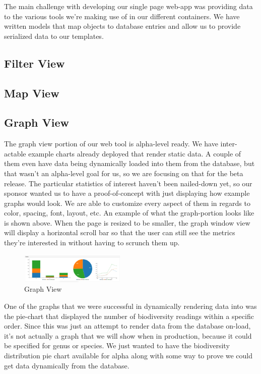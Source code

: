 \documentclass[10pt,journal,onecolumn,draftclsnofoot]{IEEEtran}
\begin{document}
The main challenge with developing our single page web-app was providing data to the various tools we’re making use of in our different containers.
We have written models that map objects to database entries and allow us to provide serialized data to our templates.

\subsection{Filter View}

\subsection{Map View}

\subsection{Graph View} %
The graph view portion of our web tool is alpha-level ready.
We have inter-actable example charts already deployed that render  static data.
A couple of them even have data being dynamically loaded into them from the database, but that wasn’t an alpha-level goal for us, so we are focusing on that for the beta release.
The particular statistics of interest haven’t been nailed-down yet, so our sponsor wanted us to have a proof-of-concept with just displaying how example graphs would look.
We are able to customize every aspect of them in regards to color, spacing, font, layout, etc.
An example of what the graph-portion looks like is shown above.
When the page is resized to be smaller, the graph window view will display a horizontal scroll bar so that the user can still see the metrics they’re interested in without having to scrunch them up.

\begin{figure}[h]
\caption{Graph View}
\centering
\includegraphics[width=0.45\textwidth]{images/figure_6.jpg}
\end{figure}

One of the graphs that we were successful in dynamically rendering data into was the pie-chart that displayed the number of biodiversity readings within a specific order.
Since this was just an attempt to render data from the database on-load, it’s not actually a graph that we will show when in production, because it could be specified for genus or species.
We just wanted to have the biodiversity distribution pie chart available for alpha along with some way to prove we could get data dynamically from the database.
\end{document}
